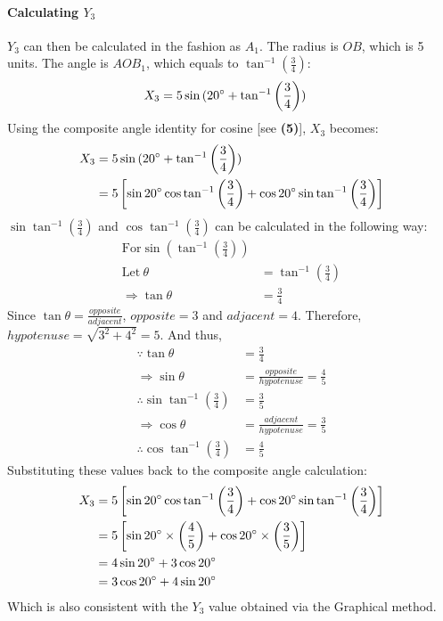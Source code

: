 \documentclass{article}
\begin{document}
            \paragraph{Calculating $Y_3$} $Y_3$ can then be calculated in the fashion as $A_1$. The radius is $OB$, which is 5 units. The angle is $AOB_1$, which equals to $\tan^{-1}{\left(\frac{3}{4}\right)}$:
            \begin{align*}
            X_3 &= 5\sin{(20\degree + \tan^{-1}{\left(\frac{3}{4}\right))}}
            \end{align*}
            Using the composite angle identity for cosine [see \textbf{(5)}], $X_3$ becomes:
            \begin{align*}
            X_3 &= 5\sin{(20\degree + \tan^{-1}{\left(\frac{3}{4}\right)})} \\
            &= 5\left[\sin{20\degree}\cos{\tan^{-1}{\left(\frac{3}{4}\right)}} + \cos{20\degree}\sin{\tan^{-1}{\left(\frac{3}{4}\right)}}\right]
            \end{align*}
            $\sin{\tan^{-1}{\left(\frac{3}{4}\right)}}$ and $\cos{\tan^{-1}{\left(\frac{3}{4}\right)}}$ can be calculated in the following way:
            \begin{align*}
            \mathrm{For} \sin{\left( \tan^{-1}{\left(\frac{3}{4}\right)}\right) } \\
            \mathrm{Let \ } \theta &= \tan^{-1}{\left(\frac{3}{4}\right)} \\
            \Rightarrow \tan{\theta} &= \frac{3}{4}
            \end{align*}
            Since $\tan{\theta} = \frac{opposite}{adjacent}$, $opposite = 3$ and $adjacent = 4$. Therefore, $hypotenuse = \sqrt{3^2 + 4^2} = 5$. And thus,
            \begin{align*}
            \because \tan{\theta} &= \frac{3}{4} \\
            \Rightarrow \sin{\theta} &= \frac{opposite}{hypotenuse} = \frac{4}{5} \\
            \therefore \sin{\tan^{-1}{\left(\frac{3}{4}\right)}} &= \frac{3}{5} \\
            \Rightarrow \cos{\theta} &= \frac{adjacent}{hypotenuse} = \frac{3}{5} \\
            \therefore \cos{\tan^{-1}{\left(\frac{3}{4}\right)}} &= \frac{4}{5}
            \end{align*}
            Substituting these values back to the composite angle calculation:
            \begin{align*}
            X_3 &= 5\left[\sin{20\degree}\cos{\tan^{-1}{\left(\frac{3}{4}\right)}} + \cos{20\degree}\sin{\tan^{-1}{\left(\frac{3}{4}\right)}}\right] \\
            &= 5\left[\sin{20\degree}\times \left( \frac{4}{5}\right)  + \cos{20\degree} \times \left( \frac{3}{5}\right)   \right] \\
            &= 4\sin{20\degree} + 3\cos{20\degree} \\
            &= 3\cos{20\degree} + 4\sin{20\degree}
            \end{align*}
            Which is also consistent with the $Y_3$ value obtained via the Graphical method.
\end{document}
